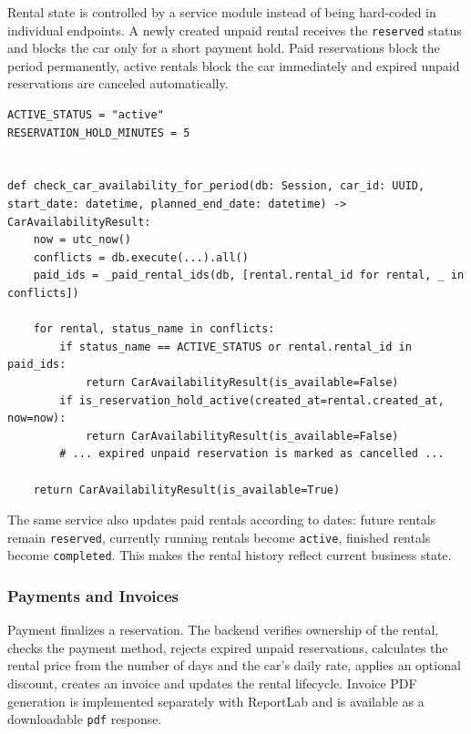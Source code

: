 Rental state is controlled by a service module instead of being hard-coded in individual endpoints. A newly created unpaid rental receives the \texttt{reserved} status and blocks the car only for a short payment hold. Paid reservations block the period permanently, active rentals block the car immediately and expired unpaid reservations are canceled automatically.

\begin{lstlisting}[style=pythonstyle,caption={Core availability rule for rentals},label={lst:backend-availability-short}]
ACTIVE_STATUS = "active"
RESERVATION_HOLD_MINUTES = 5


def check_car_availability_for_period(db: Session, car_id: UUID, start_date: datetime, planned_end_date: datetime) -> CarAvailabilityResult:
    now = utc_now()
    conflicts = db.execute(...).all()
    paid_ids = _paid_rental_ids(db, [rental.rental_id for rental, _ in conflicts])

    for rental, status_name in conflicts:
        if status_name == ACTIVE_STATUS or rental.rental_id in paid_ids:
            return CarAvailabilityResult(is_available=False)
        if is_reservation_hold_active(created_at=rental.created_at, now=now):
            return CarAvailabilityResult(is_available=False)
        # ... expired unpaid reservation is marked as cancelled ...

    return CarAvailabilityResult(is_available=True)
\end{lstlisting}

The same service also updates paid rentals according to dates: future rentals remain \texttt{reserved}, currently running rentals become \texttt{active}, finished rentals become \texttt{completed}. This makes the rental history reflect current business state.

\subsubsection{Payments and Invoices}

Payment finalizes a reservation. The backend verifies ownership of the rental, checks the payment method, rejects expired unpaid reservations, calculates the rental price from the number of days and the car's daily rate, applies an optional discount, creates an invoice and updates the rental lifecycle. Invoice PDF generation is implemented separately with ReportLab and is available as a downloadable \texttt{pdf} response.

